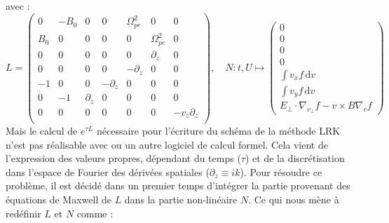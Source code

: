 avec :
\begin{equation}
  L = \begin{pmatrix}
    0   & -B_0 & 0          &  0          &  \Omega_{pe}^2 & 0             & 0 \\
    B_0 &  0   & 0          &  0          &  0             & \Omega_{pe}^2 & 0 \\
    0   &  0   & 0          &  0          &  0             & \partial_z    & 0 \\
    0   &  0   & 0          &  0          & -\partial_z    & 0             & 0 \\
   -1   &  0   & 0          & -\partial_z &  0             & 0             & 0 \\
    0   & -1   & \partial_z &  0          &  0             & 0             & 0 \\
    0   &  0   & 0          &  0          &  0             & 0             & -v_z\partial_z \\
  \end{pmatrix},
  \quad
  N:t,U\mapsto \begin{pmatrix}
    0 \\
    0 \\
    0 \\
    0 \\
    \int v_x f \,\mathrm{d}v \\
    \int v_y f \,\mathrm{d}v \\
    E_{\perp}\cdot\nabla_{v_\perp} f - v\times B\nabla_v f
  \end{pmatrix}
  \label{eq:3:LNmaxwell}
\end{equation}
Mais le calcul de $e^{\tau L}$ nécessaire pour l'écriture du schéma de la méthode LRK n'est pas réalisable avec \sympy{} ou un autre logiciel de calcul formel. Cela vient de l'expression des valeurs propres, dépendant du temps ($\tau$) et de la discrétisation dans l'espace de Fourier des dérivées spatiales ($\partial_z \equiv ik$). Pour résoudre ce problème, il est décidé dans un premier temps d'intégrer la partie provenant des équations de Maxwell de $L$ dans la partie non-linéaire $N$. Ce qui nous mène à redéfinir $L$ et $N$ comme :
